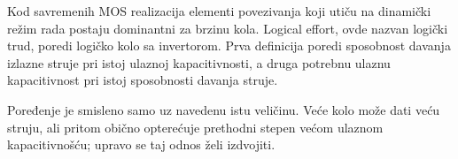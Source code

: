 Kod savremenih MOS realizacija elementi povezivanja koji utiču na dinamički režim rada postaju dominantni za brzinu kola. Logical effort, ovde nazvan logički trud, poredi logičko kolo sa invertorom. Prva definicija poredi sposobnost davanja izlazne struje pri istoj ulaznoj kapacitivnosti, a druga potrebnu ulaznu kapacitivnost pri istoj sposobnosti davanja struje.

Poređenje je smisleno samo uz navedenu istu veličinu. Veće kolo može dati veću struju, ali pritom obično opterećuje prethodni stepen većom ulaznom kapacitivnošću; upravo se taj odnos želi izdvojiti.
